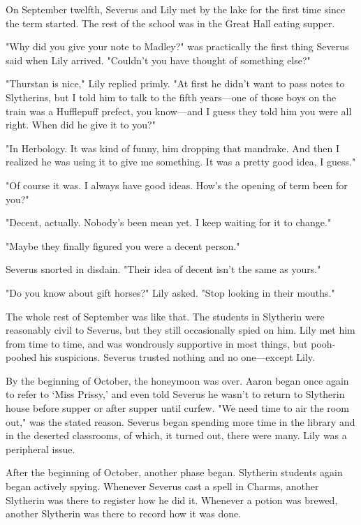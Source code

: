 On September twelfth, Severus and Lily met by the lake for the first time since the term started. The rest of the school was in the Great Hall eating supper.

"Why did you give your note to Madley?" was practically the first thing Severus said when Lily arrived. "Couldn't you have thought of something else?"

"Thurstan is nice," Lily replied primly. "At first he didn't want to pass notes to Slytherins, but I told him to talk to the fifth years—one of those boys on the train was a Hufflepuff prefect, you know—and I guess they told him you were all right. When did he give it to you?"

"In Herbology. It was kind of funny, him dropping that mandrake. And then I realized he was using it to give me something. It was a pretty good idea, I guess."

"Of course it was. I always have good ideas. How's the opening of term been for you?"

"Decent, actually. Nobody's been mean yet. I keep waiting for it to change."

"Maybe they finally figured you were a decent person."

Severus snorted in disdain. "Their idea of decent isn't the same as yours."

"Do you know about gift horses?" Lily asked. "Stop looking in their mouths."

The whole rest of September was like that. The students in Slytherin were reasonably civil to Severus, but they still occasionally spied on him. Lily met him from time to time, and was wondrously supportive in most things, but pooh-poohed his suspicions. Severus trusted nothing and no one—except Lily.

By the beginning of October, the honeymoon was over. Aaron began once again to refer to `Miss Prissy,' and even told Severus he wasn't to return to Slytherin house before supper or after supper until curfew. "We need time to air the room out," was the stated reason. Severus began spending more time in the library and in the deserted classrooms, of which, it turned out, there were many. Lily was a peripheral issue.

After the beginning of October, another phase began. Slytherin students again began actively spying. Whenever Severus cast a spell in Charms, another Slytherin was there to register how he did it. Whenever a potion was brewed, another Slytherin was there to record how it was done.


